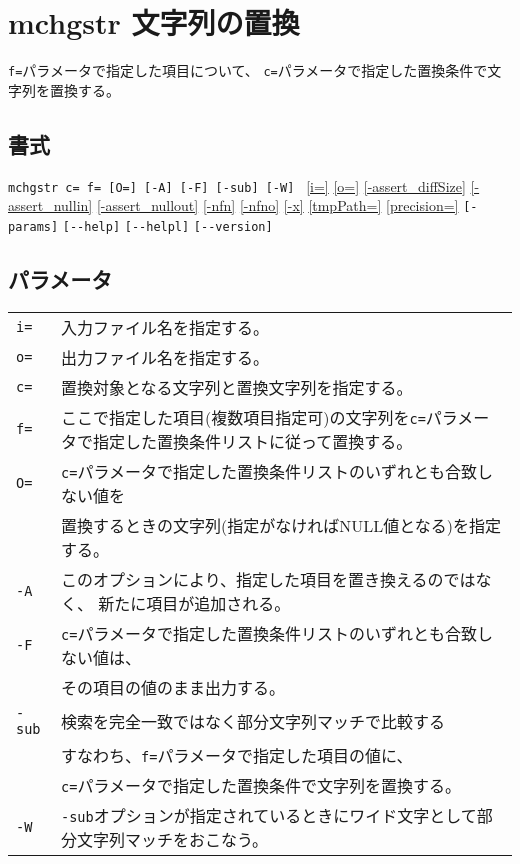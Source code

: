 
%

\section{mchgstr 文字列の置換\label{sect:mchgstr}}
\verb|f=|パラメータで指定した項目について、
\verb|c=|パラメータで指定した置換条件で文字列を置換する。

\subsection*{書式}
\verb|mchgstr c= f= [O=] [-A] [-F] [-sub] [-W] |    
\hyperref[sect:option_i]{[i=]}
\hyperref[sect:option_o]{[o=]}
\hyperref[sect:option_assert_diffSize]{[-assert\_diffSize]}
\hyperref[sect:option_assert_nullin]{[-assert\_nullin]}
\hyperref[sect:option_assert_nullout]{[-assert\_nullout]}
\hyperref[sect:option_nfn]{[-nfn]} 
\hyperref[sect:option_nfno]{[-nfno]}  
\hyperref[sect:option_x]{[-x]}
\hyperref[sect:option_option_tmppath]{[tmpPath=]}
\hyperref[sect:option_precision]{[precision=]}
\verb|[-params]|
\verb|[--help]|
\verb|[--helpl]|
\verb|[--version]|\\

\subsection*{パラメータ}
\begin{table}[htbp]
{\small
\begin{tabular}{ll}
\verb|i=|    & 入力ファイル名を指定する。\\
\verb|o=|    & 出力ファイル名を指定する。\\
\verb|c=|    & 置換対象となる文字列と置換文字列を指定する。\\
\verb|f=|    & ここで指定した項目(複数項目指定可)の文字列を\verb|c=|パラメータで指定した置換条件リストに従って置換する。\\
\verb|O=|    & \verb|c=|パラメータで指定した置換条件リストのいずれとも合致しない値を\\
             & 置換するときの文字列(指定がなければNULL値となる)を指定する。\\
\verb|-A|    & このオプションにより、指定した項目を置き換えるのではなく、
               新たに項目が追加される。\\
\verb|-F|    & \verb|c=|パラメータで指定した置換条件リストのいずれとも合致しない値は、\\
             & その項目の値のまま出力する。\\
\verb|-sub|  & 検索を完全一致ではなく部分文字列マッチで比較する\\
             & すなわち、\verb|f=|パラメータで指定した項目の値に、\\
             & \verb|c=|パラメータで指定した置換条件で文字列を置換する。\\
\verb|-W|    & \verb|-sub|オプションが指定されているときにワイド文字として部分文字列マッチをおこなう。\\
\end{tabular} 
}
\end{table} 

